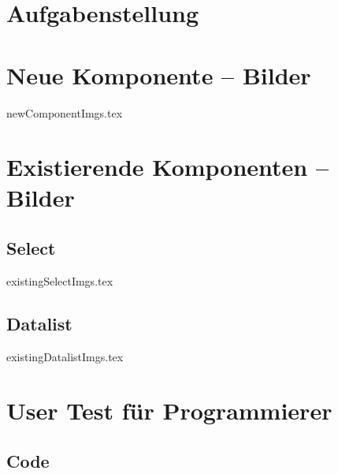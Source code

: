 \chapter{Aufgabenstellung}
\label{chap:task}




\chapter{Neue Komponente – Bilder}
\label{chap:newImgs}

\graphicspath{ {./img/newComponent/} }
{newComponentImgs.tex}
\graphicspath{ {./img/} }


\chapter{Existierende Komponenten – Bilder}
\label{chap:existingImgs}

\section*{Select}
\graphicspath{ {./img/select/} }
{existingSelectImgs.tex}
\graphicspath{ {./img/} }

\clearpage
\section*{Datalist}
\graphicspath{ {./img/datalist/} }
{existingDatalistImgs.tex}
\graphicspath{ {./img/} }


\chapter{User Test für Programmierer}
\label{chap:userTestProgrammers}

\section*{Code}

